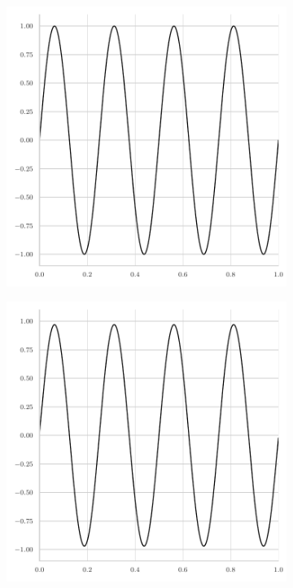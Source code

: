 \begin{figure}
	\centering
	\begin{subfigure}[b]{0.45\textwidth}
		\centering
		\includegraphics[width=\textwidth]{figures/jacobi_initial_error2.pdf}
	\end{subfigure}
	\hfill
	\begin{subfigure}[b]{0.45\textwidth}
		\centering
		\includegraphics[width=\textwidth]{figures/jacobi_final_error2.pdf}

\end{subfigure}
\end{figure}
